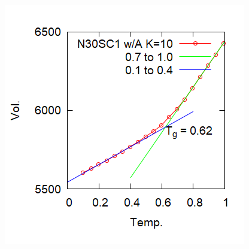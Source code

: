 \documentclass[12pt, dvipdfmx]{beamer}
\begin{document}
\begin{frame}
\begin{columns}[t, onlytextwidth]
\begin{center}
			\includegraphics[width=.8\textwidth]{N30_SC1_WA_K10.png}
		\end{center}
	\end{columns}
\end{frame}
\end{document}
